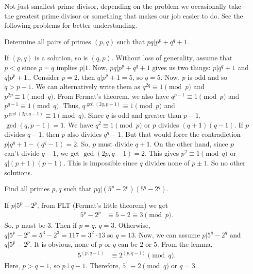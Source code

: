 \documentclass{subfile}
\begin{document}
	\begin{note}
		Not just smallest prime divisor, depending on the problem we occasionally take the greatest prime divisor or something that makes our job easier to do. See the following problems for better understanding.
	\end{note}
	
		\begin{problem}
			Determine all pairs of primes $(p,q)$ such that $pq|p^p+q^q+1$.
		\end{problem}
		
		\begin{solution}
			If $(p,q)$ is a solution, so is $(q,p)$. Without loss of generality, assume that $p<q$ since $p=q$ implies $p|1$. Now, $pq|p^p+q^q+1$ gives us two things: $p|q^q+1$ and $q|p^p+1$.. Consider $p=2$, then $q|p^p+1=5$, so $q=5$.
			Now, $p$ is odd and so $q>p+1$. We can alternatively write them as $q^{2q}\equiv1\pmod p$ and $p^{2p}\equiv1\pmod q$. From Fermat's theorem, we also have $q^{p-1}\equiv1\pmod p$ and $p^{q-1}\equiv1\pmod q$. Thus, $q^{\gcd(2q,p-1)}\equiv1\pmod p$ and $p^{\gcd(2p,q-1)}\equiv1\pmod q$. Since $q$ is odd and greater than $p-1$, $\gcd(q,p-1)=1$. We have $q^2\equiv1\pmod p$ or $p$ divides $(q+1)(q-1)$. If $p$ divides $q-1$, then $p$ also divides $q^q-1$. But that would force the contradiction $p|q^q+1-(q^q-1)=2$. So, $p$ must divide $q+1$. On the other hand, since $p$ can't divide $q-1$, we get $\gcd(2p,q-1)=2$. This gives $p^2\equiv1\pmod q$ or $q|(p+1)(p-1)$. This is impossible since $q$ divides none of $p\pm1$. So no other solutions.
		\end{solution}
		
		\begin{problem}
			Find all primes $p,q$ such that $pq|(5^p-2^p)(5^q-2^q)$.
		\end{problem}
		
		\begin{solution}
			If  $p|5^p-2^p$, from FLT (Fermat's little theorem) we get
			\begin{align*}
				5^p-2^p &\equiv5-2\equiv3\pmod p.
			\end{align*}
			So, $p$ must be $3$. Then if $p=q$, $q=3$. Otherwise, $q|5^p-2^p=5^3-2^3=117=3^2\cdot13$ so $q=13$.  Now, we can assume $p|5^q-2^q$ and $q|5^p-2^p$. It is obvious, none of $p$ or $q$ can be $2$ or $5$. From the lemma,
			\begin{align*}
				5^{(p,q-1)}&\equiv2^{(p,q-1)}\pmod q.
			\end{align*}
			Here, $p>q-1$, so $p\bot q-1$. Therefore, $5^1\equiv2\pmod q$ or $q=3$.
		\end{solution}
		
\end{document}
